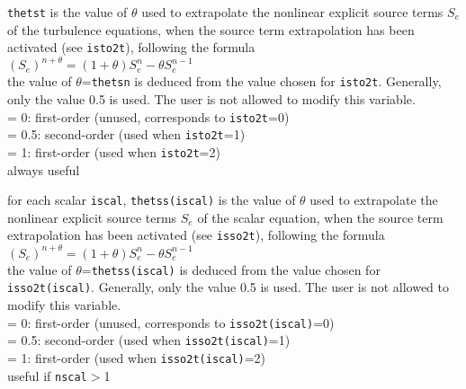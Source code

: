 {{\tt thetst} is the value of $\theta$ used to
extrapolate the nonlinear explicit source terms $S_e$ of the turbulence equations,
when the source term extrapolation has been activated (see {\tt isto2t}),
following the formula\\
$(S_e)^{n+\theta}=(1+\theta)S_e^n-\theta S_e^{n-1}$\\
the value
of $\theta$={\tt thetsn} is deduced from the value chosen for
{\tt isto2t}. Generally, only the value 0.5 is used. The user is not
allowed to modify this variable.\\
\hspace*{1.3cm}= 0: first-order (unused, corresponds to {\tt isto2t}=0) \\
\hspace*{1.3cm}= 0.5: second-order (used when {\tt isto2t}=1) \\
\hspace*{1.3cm}= 1: first-order (used when {\tt isto2t}=2) \\
always useful}

{for each scalar {\tt iscal}, {\tt thetss(iscal)} is the value of $\theta$ used to
extrapolate the nonlinear explicit source terms $S_e$ of the scalar equation,
when the source term extrapolation has been activated (see {\tt isso2t}),
following the formula\\
$(S_e)^{n+\theta}=(1+\theta)S_e^n-\theta S_e^{n-1}$\\
the value
of $\theta$={\tt thetss(iscal)} is deduced from the value chosen for
{\tt isso2t(iscal)}. Generally, only the value 0.5 is used. The user is not
allowed to modify this variable.\\
\hspace*{1.3cm}= 0: first-order (unused, corresponds to {\tt isso2t(iscal)}=0) \\
\hspace*{1.3cm}= 0.5: second-order (used when {\tt isso2t(iscal)}=1) \\
\hspace*{1.3cm}= 1: first-order (used when {\tt isso2t(iscal)}=2) \\
useful if {\tt nscal}$>$1}


